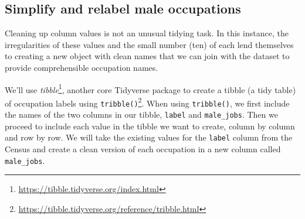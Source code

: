 \documentclass[
  krantz2]{krantz}
\begin{document}
\hypertarget{simplify-and-relabel-male-occupations}{%
\subsection{Simplify and relabel male occupations}\label{simplify-and-relabel-male-occupations}}

Cleaning up column values is not an unusual tidying task. In this instance, the irregularities of these values and the small number (ten) of each lend themselves to creating a new object with clean names that we can join with the dataset to provide comprehensible occupation names.

We'll use \emph{tibble}\footnote{\url{https://tibble.tidyverse.org/index.html}}, another core Tidyverse package to create a tibble (a tidy table) of occupation labels using \texttt{tribble()}\footnote{\url{https://tibble.tidyverse.org/reference/tribble.html}}. When using \texttt{tribble()}, we first include the names of the two columns in our tibble, \texttt{label} and \texttt{male\_jobs}. Then we proceed to include each value in the tibble we want to create, column by column and row by row. We will take the existing values for the \texttt{label} column from the Census and create a clean version of each occupation in a new column called \texttt{male\_jobs}.
\end{document}
